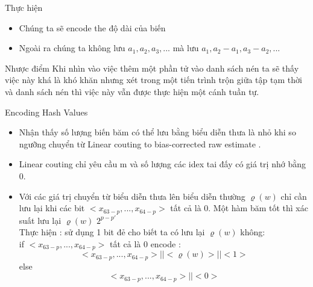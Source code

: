 \documentclass{beamer}
\newcommand{\bi}{\begin{itemize}}
\newcommand{\ei}{\end{itemize}}
\begin{document}
\begin{frame}{Thực hiện}
\begin{itemize}
\item Chúng ta sẽ encode the độ dài của biến
\item Ngoài ra chúng ta không lưu $a_1,a_2,a_3,...$ mà lưu $ a_1,a_2-a_1,a_3-a_2,...$
\end{itemize}
\end{frame}
\begin{frame}{Nhược điểm }
Khi nhìn vào việc thêm một phần tử vào danh sách nén ta sẽ thấy việc này khá là khó khăn nhưng xét trong một tiến trình trộn giữa tập tạm thời và danh sách nén thì việc này vẫn được thực hiện một cánh tuần tự.
\end{frame}
\begin{frame}{Encoding Hash Values}
\bi 
\item Nhận thấy số lượng biến băm có thể lưu bằng biểu diễn thưa là nhỏ khi so ngưỡng chuyển từ Linear couting to bias-corrected raw
estimate . \\
\item Linear couting  chỉ yêu cầu m và số lượng các idex tai đấy có giá trị nhớ bằng 0.\\
\item Với các giá trị chuyển từ biểu diễn thưa lên biểu diễn thường $\varrho(w)$ chỉ cần lưu lại khi các bit $<x_{63-p} ,...,x_{64-p}>$ tất cả là 0. Một hàm băm tốt thì xác suất lưu lại  $\varrho(w)$ $ 2^{p-p'}$
\\Thực hiện : sử dụng 1 bit đẻ cho biết ta có lưu lại $\varrho(w)$ không:\\
 
if $<x_{63-p} ,...,x_{64-p}>$ tất cả là 0 encode :  $$<x_{63-p} ,...,x_{64-p}> || <\varrho(w)>||<1>$$
else $$<x_{63-p} ,...,x_{64-p}> ||<0>$$ 
\ei
\end{frame}
\end{document}
